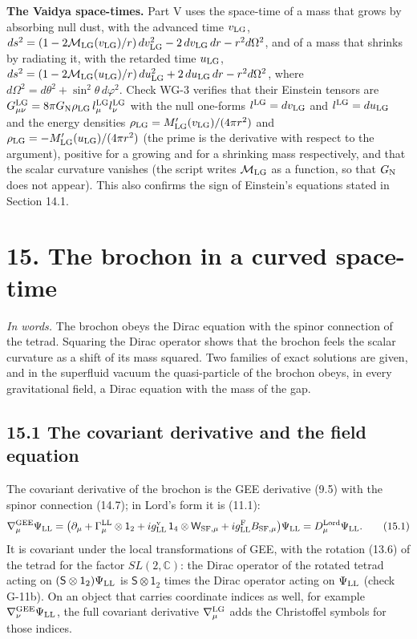 \documentclass[
  10pt,
]{article}
\begin{document}
\textbf{The Vaidya space-times.} Part V uses the space-time of a mass
that grows by absorbing null dust, with the advanced time
\(v_{\rm LG}\),
\(ds^2=(1-2\mathcal M_{\rm LG}(v_{\rm LG})/r)\,dv_{\rm LG}^2-2\,dv_{\rm LG}\,dr-r^2d\Omega^2\),
and of a mass that shrinks by radiating it, with the retarded time
\(u_{\rm LG}\),
\(ds^2=(1-2\mathcal M_{\rm LG}(u_{\rm LG})/r)\,du_{\rm LG}^2+2\,du_{\rm LG}\,dr-r^2d\Omega^2\),
where \(d\Omega^2=d\theta^2+\sin^2\theta\,d\varphi^2\). Check WG-3
verifies that their Einstein tensors are
\(G^{\rm LG}_{\mu\nu}=8\pi G_{\rm N}\rho_{\rm LG}\,l^{\rm LG}_\mu l^{\rm LG}_\nu\)
with the null one-forms \(l^{\rm LG}=dv_{\rm LG}\) and
\(l^{\rm LG}=du_{\rm LG}\) and the energy densities
\(\rho_{\rm LG}=M_{\rm LG}'(v_{\rm LG})/(4\pi r^2)\) and
\(\rho_{\rm LG}=-M_{\rm LG}'(u_{\rm LG})/(4\pi r^2)\) (the prime is the
derivative with respect to the argument), positive for a growing and for
a shrinking mass respectively, and that the scalar curvature vanishes
(the script writes \(\mathcal M_{\rm LG}\) as a function, so that
\(G_{\rm N}\) does not appear). This also confirms the sign of
Einstein's equations stated in Section 14.1.

\hypertarget{the-brochon-in-a-curved-space-time}{%
\section{15. The brochon in a curved
space-time}\label{the-brochon-in-a-curved-space-time}}

\emph{In words.} The brochon obeys the Dirac equation with the spinor
connection of the tetrad. Squaring the Dirac operator shows that the
brochon feels the scalar curvature as a shift of its mass squared. Two
families of exact solutions are given, and in the superfluid vacuum the
quasi-particle of the brochon obeys, in every gravitational field, a
Dirac equation with the mass of the gap.

\hypertarget{the-covariant-derivative-and-the-field-equation}{%
\subsection{15.1 The covariant derivative and the field
equation}\label{the-covariant-derivative-and-the-field-equation}}

The covariant derivative of the brochon is the GEE derivative (9.5) with
the spinor connection (14.7); in Lord's form it is (11.1):
\[\nabla^{\rm GEE}_\mu\Psi_{\rm LL}=\big(\partial_\mu+\Gamma^{\rm LL}_\mu\otimes\mathsf 1_2+ig^{\rm v}_{\rm LL}\,\mathsf 1_4\otimes\mathsf W_{{\rm SF},\mu}+ig^{\rm F}_{\rm LL}B_{{\rm SF},\mu}\big)\Psi_{\rm LL}=D^{\rm Lord}_\mu\Psi_{\rm LL}.\tag{15.1}\]
It is covariant under the local transformations of GEE, with the
rotation (13.6) of the tetrad for the factor \(SL(2,\mathbb C)\): the
Dirac operator of the rotated tetrad acting on
\((\mathsf S\otimes\mathsf 1_2)\Psi_{\rm LL}\) is
\(\mathsf S\otimes\mathsf 1_2\) times the Dirac operator acting on
\(\Psi_{\rm LL}\) (check G-11b). On an object that carries coordinate
indices as well, for example \(\nabla^{\rm GEE}_\nu\Psi_{\rm LL}\), the
full covariant derivative \(\nabla^{\rm LG}_\mu\) adds the Christoffel
symbols for those indices.
\end{document}
